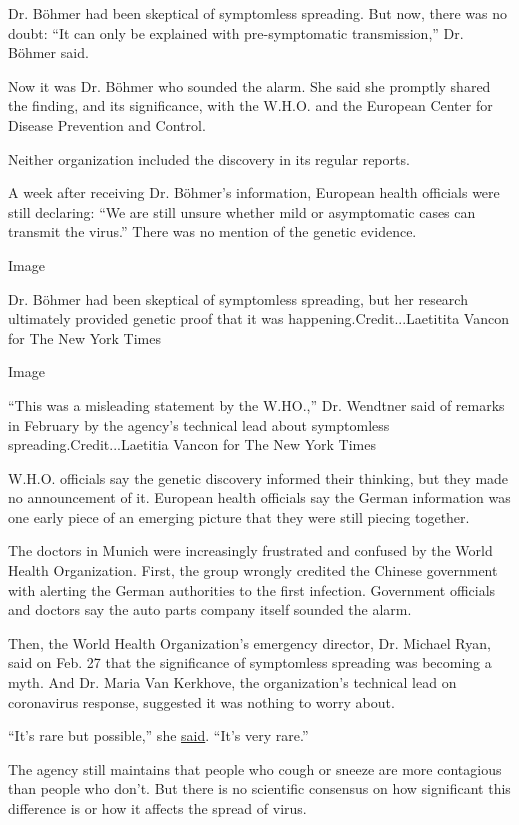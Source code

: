 Dr. Böhmer had been skeptical of symptomless spreading. But now, there
was no doubt: ``It can only be explained with pre-symptomatic
transmission,'' Dr. Böhmer said.

Now it was Dr. Böhmer who sounded the alarm. She said she promptly
shared the finding, and its significance, with the W.H.O. and the
European Center for Disease Prevention and Control.

Neither organization included the discovery in its regular reports.

A week after receiving Dr. Böhmer's information, European health
officials were still declaring: ``We are still unsure whether mild or
asymptomatic cases can transmit the virus.'' There was no mention of the
genetic evidence.

Image

Dr. Böhmer had been skeptical of symptomless spreading, but her research
ultimately provided genetic proof that it was
happening.Credit...Laetitita Vancon for The New York Times

Image

``This was a misleading statement by the W.HO.,'' Dr. Wendtner said of
remarks in February by the agency's technical lead about symptomless
spreading.Credit...Laetitia Vancon for The New York Times

W.H.O. officials say the genetic discovery informed their thinking, but
they made no announcement of it. European health officials say the
German information was one early piece of an emerging picture that they
were still piecing together.

The doctors in Munich were increasingly frustrated and confused by the
World Health Organization. First, the group wrongly credited the Chinese
government with alerting the German authorities to the first infection.
Government officials and doctors say the auto parts company itself
sounded the alarm.

Then, the World Health Organization's emergency director, Dr. Michael
Ryan, said on Feb. 27 that the significance of symptomless spreading was
becoming a myth. And Dr. Maria Van Kerkhove, the organization's
technical lead on coronavirus response, suggested it was nothing to
worry about.

``It's rare but possible,'' she
\href{https://www.youtube.com/watch?v=SCgCzYAHusA\&t=22m55s}{said}.
``It's very rare.''

The agency still maintains that people who cough or sneeze are more
contagious than people who don't. But there is no scientific consensus
on how significant this difference is or how it affects the spread of
virus.


